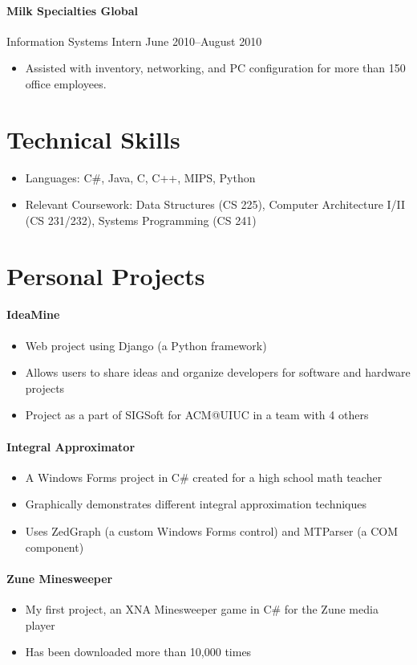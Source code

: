 \documentclass[letterpaper,12pt]{article}
\begin{document}
\paragraph {Milk Specialties Global}
Information Systems Intern \hfill June 2010--August 2010
\begin{itemize}
\item Assisted with inventory, networking, and PC configuration
for more than 150 office employees.
\end{itemize}

\section*{Technical Skills}
\begin{itemize}
\item Languages: C\#, Java, C, C++, MIPS, Python
\item Relevant Coursework: Data Structures (CS 225),
Computer Architecture I/II (CS 231/232), Systems Programming (CS 241)
\end{itemize}

\section*{Personal Projects}
\paragraph{IdeaMine}
\begin{itemize}
\item Web project using Django (a Python framework)
\item Allows users to share ideas and organize developers
for software and hardware projects
\item Project as a part of SIGSoft for ACM@UIUC in a team with 4 others
\end{itemize}

\paragraph{Integral Approximator}
\begin{itemize}
\item A Windows Forms project in C\# created for a high school math teacher
\item Graphically demonstrates different integral approximation techniques
\item Uses ZedGraph (a custom Windows Forms control)
and MTParser (a COM component)
\end{itemize}

\paragraph{Zune Minesweeper}
\begin{itemize}
\item My first project, an XNA Minesweeper game in C\#
for the Zune media player
\item Has been downloaded more than 10,000 times
\end{itemize}
\end{document}
